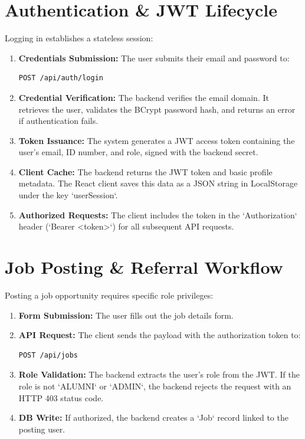 \section{Authentication \& JWT Lifecycle}
Logging in establishes a stateless session:
\begin{enumerate}
    \item \textbf{Credentials Submission:} The user submits their email and password to:
    \begin{lstlisting}[language=bash]
    POST /api/auth/login
    \end{lstlisting}
    \item \textbf{Credential Verification:} The backend verifies the email domain. It retrieves the user, validates the BCrypt password hash, and returns an error if authentication fails.
    \item \textbf{Token Issuance:} The system generates a JWT access token containing the user's email, ID number, and role, signed with the backend secret.
    \item \textbf{Client Cache:} The backend returns the JWT token and basic profile metadata. The React client saves this data as a JSON string in LocalStorage under the key `userSession`.
    \item \textbf{Authorized Requests:} The client includes the token in the `Authorization` header (`Bearer <token>`) for all subsequent API requests.
\end{enumerate}

\section{Job Posting \& Referral Workflow}
Posting a job opportunity requires specific role privileges:
\begin{enumerate}
    \item \textbf{Form Submission:} The user fills out the job details form.
    \item \textbf{API Request:} The client sends the payload with the authorization token to:
    \begin{lstlisting}[language=bash]
    POST /api/jobs
    \end{lstlisting}
    \item \textbf{Role Validation:} The backend extracts the user's role from the JWT. If the role is not `ALUMNI` or `ADMIN`, the backend rejects the request with an HTTP 403 status code.
    \item \textbf{DB Write:} If authorized, the backend creates a `Job` record linked to the posting user.
\end{enumerate}

